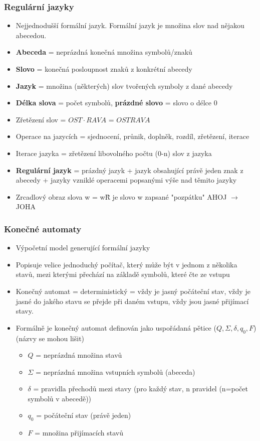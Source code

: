 \documentclass[10pt,a4paper]{article}
\begin{document}
\subsubsection{Regulární jazyky}
\begin{itemize}
\item Nejjednodušší formální jazyk. Formální jazyk je množina slov nad nějakou abecedou.
\item \textbf{Abeceda} = neprázdná konečná množina symbolů/znaků
\item \textbf{Slovo} = konečná posloupnost znaků z konkrétní abecedy
\item \textbf{Jazyk} = množina (některých) slov tvořených symboly z dané abecedy
\item \textbf{Délka slova} = počet symbolů, \textbf{prázdné slovo} = slovo o délce 0
\item Zřetězení slov = $OST \cdot RAVA$ = $OSTRAVA$
\item Operace na jazycích = sjednocení, průnik, doplněk, rozdíl, zřetězení, iterace
\item Iterace jazyka = zřetězení libovolného počtu (0-n) slov z jazyka
\item \textbf{Regulární jazyk} = prázdný jazyk + jazyk obsahující právě jeden znak z abecedy + jazyky vzniklé operacemi popsanými výše nad těmito jazyky
\item Zrcadlový obraz slova w = w\^R je slovo w zapsané "pozpátku" AHOJ $\rightarrow$ JOHA
\end{itemize}

\subsubsection{Konečné automaty}
\begin{itemize}
\item Výpočetní model generující formální jazyky
\item Popisuje velice jednoduchý počítač, který může být v jednom z několika stavů, mezi kterými přechází na základě symbolů, které čte ze vstupu
\item Konečný automat = deterministický = vždy je jasný počáteční stav, vždy je jasné do jakého stavu se přejde při daném vstupu, vždy jsou jasné přijímací stavy.
\item Formálně je konečný automat definován jako uspořádaná pětice ($Q, \Sigma, \delta, q_0, F$) (názvy se mohou lišit)
\begin{itemize}
\item $Q$ = neprázdná množina stavů
\item $\Sigma$ = neprázdná množina vstupních symbolů (abeceda)
\item $\delta$ = pravidla přechodů mezi stavy (pro každý stav, n pravidel (n=počet symbolů v abecedě))
\item $q_0$ = počáteční stav (právě jeden)
\item $F$ = množina přijímacích stavů
\end{itemize}
\end{itemize}
\end{document}
